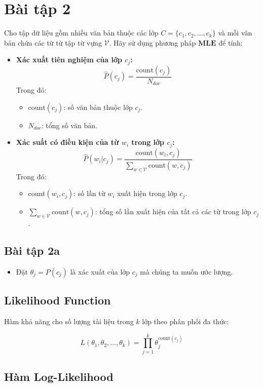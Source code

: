\documentclass[a4paper, 15pt]{article}
\begin{document}
\section*{Bài tập 2}
Cho tập dữ liệu gồm nhiều văn bản thuộc các lớp $C = \{c_1, c_2, \ldots , c_k\}$ và mỗi văn bản chứa các từ từ tập từ vựng $\mathcal{V}$. Hãy sử dụng phương pháp $\textbf{MLE}$ để tính:
\begin{itemize}
    \item \textbf{Xác xuất tiên nghiệm của lớp $c_j$:}
    $$\hat{P}(c_j)=\frac{\text{count}(c_j)}{N_{doc}}$$
    Trong đó:
        \begin{itemize}[label=$\bullet$] 
            \item $\text{count}(c_j)$: số văn bản thuộc lớp $c_j$.
            \item $N_{doc}$: tổng số văn bản.
        \end{itemize}
    \item \textbf{Xác suất có điều kiện của từ $w_i$ trong lớp $c_j$:}
    $$\hat{P}(w_i|c_j)=\frac{\text{count}(w_i,c_j)}{\sum_{w\in \mathcal{V}}\text{count}(w,c_j)}$$
    Trong đó:
    \begin{itemize}[label=$\bullet$]
        \item count$(w_i,c_j)$: số lần từ $w_i$ xuất hiện trong lớp $c_j$.
        \item $\sum_{w\in \mathcal{V}}\text{count}(w,c_j)$: tổng số lần xuất hiện của tất cả các từ trong lớp $c_j$.
    \end{itemize}
\end{itemize}
\subsection*{Bài tập 2a}
\begin{itemize}
    \item Đặt \( \theta_j = P(c_j) \) là xác xuất của lớp $c_j$ mà chúng ta muốn ước lượng.
\end{itemize}

\subsection*{Likelihood Function}

Hàm khả năng cho số lượng tài liệu trong \( k \) lớp theo phân phối đa thức:

\[
    L(\theta_1, \theta_2, \dots, \theta_k) = \prod_{j=1}^k \theta_j^{\text{count}(c_j)}
\]

\subsection*{Hàm Log-Likelihood}
\end{document}
